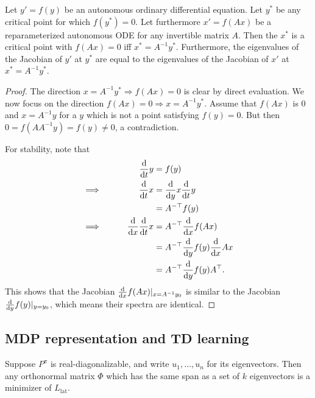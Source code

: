 \begin{lemma}
\label{lem:understanding:stability}
Let $y' = f(y)$ be an autonomous ordinary differential equation. Let $y^*$ be any critical point for which $f(y^*) = 0$. Let furthermore $x' = f(A x)$ be a reparameterized autonomous ODE for any invertible matrix $A$.
Then the $x^*$ is a critical point with $f(Ax) = 0$ iff $x^* = A^{-1}y^*$.
Furthermore, the eigenvalues of the Jacobian of $y'$ at $y^*$ are equal to the eigenvalues of the Jacobian of $x'$ at $x^* = A^{-1}y^*$.
\end{lemma}

\begin{proof}
The direction $x = A^{-1}y^* \Rightarrow f(Ax) = 0$ is clear by direct evaluation. We now focus on the direction $f(Ax) = 0 \Rightarrow x = A^{-1}y^*$. Assume that $f(Ax)$ is $0$ and $x = A^{-1}y$ for a $y$ which is not a point satisfying $f(y)=0$. But then $0 = f(AA^{-1}y) = f(y) \neq 0$, a contradiction.

For stability, note that
\begin{alignat*}{2}
    &\qquad&\frac{\mathrm{d}}{\mathrm{d} t} y & = f(y) \\
    \implies&&\frac{\mathrm{d}}{\mathrm{d} t} x & = \frac{\mathrm{d}}{\mathrm{d} y} x \frac{\mathrm{d}}{\mathrm{d} t} y\\
    && &= A^{-\top} f(y)\\
    \implies&& \frac{\mathrm{d}}{\mathrm{d} x} \frac{\mathrm{d}}{\mathrm{d} t} x &= A^{-\top} \frac{\mathrm{d}}{\mathrm{d} x} f(A x)\\
    && &= A^{-\top}  \frac{\mathrm{d}}{\mathrm{d} y} f(y) \frac{\mathrm{d}}{\mathrm{d} x} A x\\
    && &= A^{-\top}  \frac{\mathrm{d}}{\mathrm{d} y} f(y) A^\top.
\end{alignat*}
This shows that the Jacobian $\frac{\mathrm{d}}{\mathrm{d} x} f(Ax)|_{x=A^{-1}y_0}$ is similar to the Jacobian $\frac{\mathrm{d}}{\mathrm{d} y} f(y)|_{y=y_0}$, which means their spectra are identical.
\end{proof}


\subsection{MDP representation and TD learning}

\begin{lemma}\label{prop:understanding:TangResult2}
    Suppose $P^\pi$ is real-diagonalizable, and write $u_1,\dots, u_n$ for its eigenvectors. Then any orthonormal matrix $\Phi$ which has the same span as a set of $k$ eigenvectors is a minimizer of $L_{\text{lat}}$.
\end{lemma}


